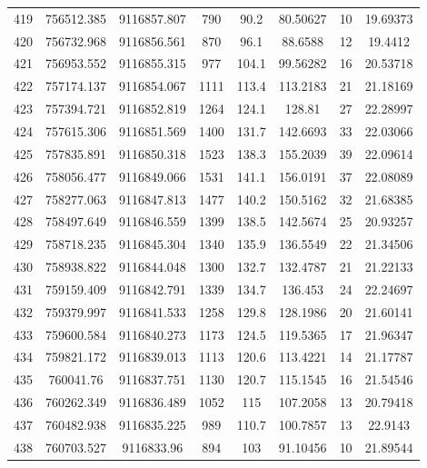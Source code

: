 \begin{longtable}{cccccccc}
419  & 756512.385      & 9116857.807      & 790     & 90.2  & 80.50627 & 10 & 19.69373 \\
420  & 756732.968      & 9116856.561      & 870     & 96.1  & 88.6588  & 12 & 19.4412  \\
421  & 756953.552      & 9116855.315      & 977     & 104.1 & 99.56282 & 16 & 20.53718 \\
422  & 757174.137      & 9116854.067      & 1111    & 113.4 & 113.2183 & 21 & 21.18169 \\
423  & 757394.721      & 9116852.819      & 1264    & 124.1 & 128.81   & 27 & 22.28997 \\
424  & 757615.306      & 9116851.569      & 1400    & 131.7 & 142.6693 & 33 & 22.03066 \\
425  & 757835.891      & 9116850.318      & 1523    & 138.3 & 155.2039 & 39 & 22.09614 \\
426  & 758056.477      & 9116849.066      & 1531    & 141.1 & 156.0191 & 37 & 22.08089 \\
427  & 758277.063      & 9116847.813      & 1477    & 140.2 & 150.5162 & 32 & 21.68385 \\
428  & 758497.649      & 9116846.559      & 1399    & 138.5 & 142.5674 & 25 & 20.93257 \\
429  & 758718.235      & 9116845.304      & 1340    & 135.9 & 136.5549 & 22 & 21.34506 \\
430  & 758938.822      & 9116844.048      & 1300    & 132.7 & 132.4787 & 21 & 21.22133 \\
431  & 759159.409      & 9116842.791      & 1339    & 134.7 & 136.453  & 24 & 22.24697 \\
432  & 759379.997      & 9116841.533      & 1258    & 129.8 & 128.1986 & 20 & 21.60141 \\
433  & 759600.584      & 9116840.273      & 1173    & 124.5 & 119.5365 & 17 & 21.96347 \\
434  & 759821.172      & 9116839.013      & 1113    & 120.6 & 113.4221 & 14 & 21.17787 \\
435  & 760041.76       & 9116837.751      & 1130    & 120.7 & 115.1545 & 16 & 21.54546 \\
436  & 760262.349      & 9116836.489      & 1052    & 115   & 107.2058 & 13 & 20.79418 \\
437  & 760482.938      & 9116835.225      & 989     & 110.7 & 100.7857 & 13 & 22.9143  \\
438  & 760703.527      & 9116833.96       & 894     & 103   & 91.10456 & 10 & 21.89544 \\

\end{longtable}
